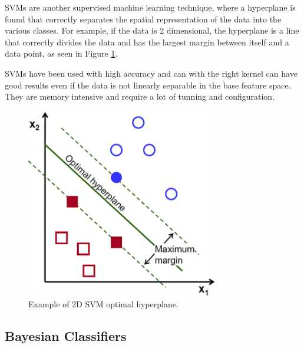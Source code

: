 SVMs are another supervised machine learning technique, where a hyperplane is found that correctly separates the spatial representation of the data into the various classes.  For example, if the data is 2 dimensional, the hyperplane is a line that correctly divides the data and has the largest margin between itself and a data point, as seen in Figure \ref{fig:svm}. 

SVMs have been used with high accuracy and can with the right kernel can have good results even if the data is not linearly separable in the base feature space. They are memory intensive and require a lot of tunning and configuration.


\begin{figure}[!htb]
  \centering
  \includegraphics[width=0.75\textwidth]{Figures/svm.png}
  \caption{Example of 2D SVM optimal hyperplane.}
  \label{fig:svm}
\end{figure}

\subsection{Bayesian Classifiers}
\label{subsection:bc}

